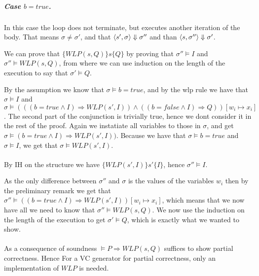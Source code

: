 \subparagraph{Case $b = true $.}
In this case the loop does not terminate, but executes another iteration of the body.
That means $\sigma \neq \sigma'$, and that $\langle s',\sigma \rangle \Downarrow \sigma''$ and than $\langle s, \sigma'' \rangle \Downarrow \sigma'$.


We can prove that $\{WLP(s, Q)\}s\{Q\}$ by proving that $\sigma'' \vDash I$ and $\sigma'' \vDash WLP(s, Q)$,
from where we can use induction on the length of the execution to say that $\sigma' \vDash Q$.

By the assumption we know that $\sigma \vDash b = true$,
and by the wlp rule we have that $\sigma \vDash I$ and
$\sigma \vDash (((b = true \land I) \Rightarrow WLP(s', I)) \wedge ((b = false \wedge I) \Rightarrow Q)) [ w_{i} \mapsto x_{i}]$.
The second part of the conjunction is trivially true, hence we dont consider it in the rest of the proof.
Again we instatiate all variables to those in $\sigma$, and get $\sigma \vDash (b = true \land I) \Rightarrow WLP(s', I))$.
Because we have that $\sigma \vDash b = true$ and $\sigma \vDash I$, we get that $\sigma \vDash WLP(s', I)$.
\\~\\

By IH on the structure we have $\{WLP(s', I)\}s'\{I\}$, hence $\sigma'' \vDash I$.

As the only difference between $\sigma''$ and $\sigma$ is the values of the variables $w_{i}$ then by the preliminary remark we get that $\sigma'' \vDash ((b = true \land I) \Rightarrow WLP(s', I)) [ w_{i} \mapsto x_{i}]$,
which means that we now have all we need to know that $\sigma'' \vDash WLP(s, Q)$.
We now use the induction on the length of the execution to get $\sigma' \vDash Q$,
which is exactly what we wanted to show.
\\~\\
As a consequence of soundness $\vDash P \Rightarrow WLP(s, Q)$ suffices to show partial correctness.
Hence For a VC generator for partial correctness, only an implementation of $WLP$ is needed.